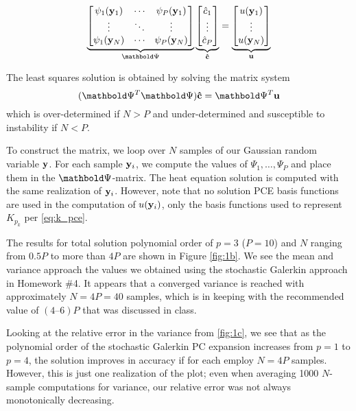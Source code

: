 \documentclass[11pt]{article}
\begin{document}
\begin{equation}
\underbrace{
\begin{bmatrix}
\psi_1(\mb{y}_1) & \cdots & \psi_P(\mb{y}_1) \\
\vdots & \ddots & \vdots \\
\psi_1(\mb{y}_N) & \cdots & \psi_P(\mb{y}_N)
\end{bmatrix}
}_{\mb{\Psi}}
\underbrace{
\begin{bmatrix}
\hat{c}_1 \\ \vdots \\ \hat{c}_P
\end{bmatrix}
}_{\mb{\hat{c}}}
=
\underbrace{
\begin{bmatrix}
u(\mb{y}_1) \\ \vdots \\ u(\mb{y}_N)
\end{bmatrix}
}_{\mb{u}}
\end{equation}

The least squares solution is obtained by solving the matrix system
\begin{equation}
( \mb{\Psi}^T \mb{\Psi} ) \mb{\hat{c}} = \mb{\Psi}^T \mb{u}
\end{equation}
which is over-determined if $N > P$ and under-determined and susceptible to instability if $N < P$.

To construct the matrix, we loop over $N$ samples of our Gaussian random variable $\mb{y}$. For each sample $\mb{y}_i$, we compute the values of $\Psi_1, \dots, \Psi_P$ and place them in the $\mb{\Psi}$-matrix. The heat equation solution is computed with the same realization of $\mb{y}_i$. However, note that no solution PCE basis functions are used in the computation of $u(\mb{y}_i)$, only the basis functions used to represent $K_{p_k}$ per \eqref{eq:k_pce}.

The results for total solution polynomial order of $p=3$ ($P=10$) and $N$ ranging from $0.5 P$ to more than $4 P$ are shown in Figure \ref{fig:1b}. We see the mean and variance approach the values we obtained using the stochastic Galerkin approach in Homework \#4. It appears that a converged variance is reached with approximately $N=4P=40$ samples, which is in keeping with the recommended value of $(4\text{--}6)P$ that was discussed in class.

Looking at the relative error in the variance from \ref{fig:1c}, we see that as the polynomial order of the stochastic Galerkin PC expansion increases from $p=1$ to $p=4$, the solution improves in accuracy if for each employ $N=4P$ samples. However, this is just one realization of the plot; even when averaging 1000 $N$-sample computations for variance, our relative error was not always monotonically decreasing.
\end{document}
